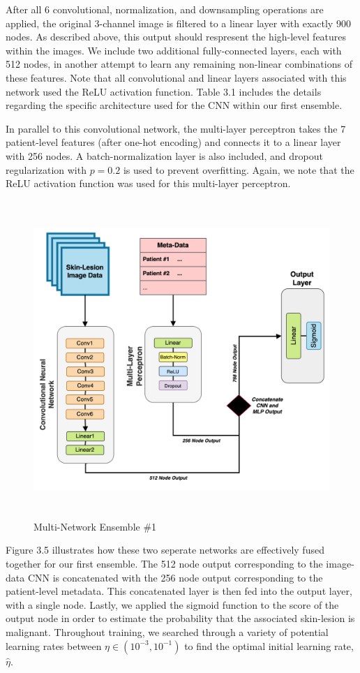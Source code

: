 \documentclass [MAS] {uclathes}
\begin{document}
After all 6 convolutional, normalization, and downsampling operations are applied, the original 3-channel image is filtered to a linear layer with exactly 900 nodes. As described above, this output should respresent the high-level features within the images. We include two additional fully-connected layers, each with 512 nodes, in another attempt to learn any remaining non-linear combinations of these features. Note that all convolutional and linear layers associated with this network used the ReLU activation function. Table 3.1 includes the details regarding the specific architecture used for the CNN within our first ensemble.

In parallel to this convolutional network, the multi-layer perceptron takes the 7 patient-level features (after one-hot encoding) and connects it to a linear layer with 256 nodes. A batch-normalization layer is also included, and dropout regularization with $p=0.2$ is used to prevent overfitting. Again, we note that the ReLU activation function was used for this multi-layer perceptron. 

\begin{figure}[h]
\centering
\includegraphics[height = 120mm, width= 140mm]{imgs/ens1_arch.png}
\caption{Multi-Network Ensemble \#1}
\label{fig:ens1_arch}
\end{figure}

Figure 3.5 illustrates how these two seperate networks are effectively fused together for our first ensemble. The 512 node output corresponding to the image-data CNN is concatenated with the 256 node output corresponding to the patient-level metadata. This concatenated layer is then fed into the output layer, with a single node. Lastly, we applied the sigmoid function to the score of the output node in order to estimate the probability that the associated skin-lesion is malignant. Throughout training, we searched through a variety of potential learning rates between $\eta \in (10^{-3}, 10^{-1})$ to find the optimal initial learning rate, $\hat{\eta}$.
\end{document}
